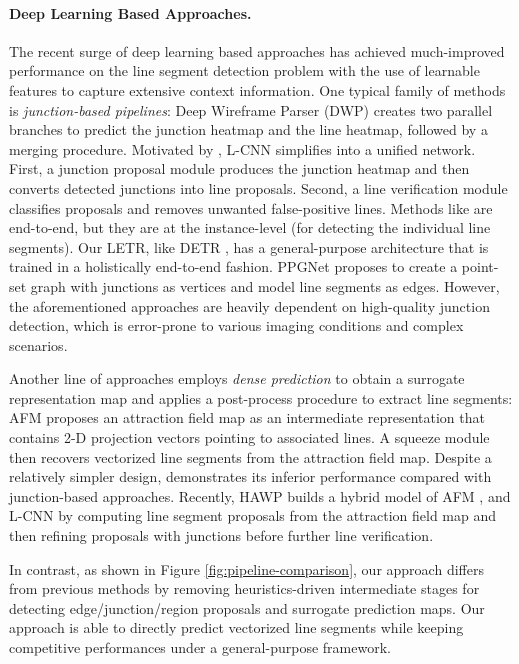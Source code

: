 \documentclass[final]{cvpr}
\begin{document}
\paragraph{Deep Learning Based Approaches.} The recent surge of deep learning based approaches has achieved much-improved performance on the line segment detection problem \cite{huang2018learning,xue2019learning,zhou2019end,PPGNet,xue2020holistically} with the use of learnable features to capture extensive context information.
One typical family of methods is \textit{junction-based pipelines}: Deep Wireframe Parser (DWP) \cite{huang2018learning} creates two parallel branches to predict the junction heatmap and the line heatmap, followed by a merging procedure. Motivated by \cite{fasterrcnn}, L-CNN \cite{zhou2019end} simplifies \cite{huang2018learning} into a unified network. First, a junction proposal module produces the junction heatmap and then converts detected junctions into line proposals. Second, a line verification module classifies proposals and removes unwanted false-positive lines. Methods like \cite{zhou2019end} are end-to-end, but they are at the instance-level (for detecting the individual line segments). Our LETR, like DETR \cite{carion2020end}, has a general-purpose architecture that is trained in a holistically end-to-end fashion. PPGNet \cite{PPGNet} proposes to create a point-set graph with junctions as vertices and model line segments as edges. However, the aforementioned approaches are heavily dependent on high-quality junction detection, which is error-prone to various imaging conditions and complex scenarios. 

Another line of approaches employs \textit{dense prediction} to obtain a surrogate representation map and applies a post-process procedure to extract line segments: AFM \cite{xue2019learning} proposes an attraction field map as an intermediate representation that contains 2-D projection vectors pointing to associated lines. A squeeze module then recovers vectorized line segments from the attraction field map. Despite a relatively simpler design, \cite{xue2019learning} demonstrates its inferior performance compared with junction-based approaches. Recently, HAWP \cite{xue2020holistically} builds a hybrid model of AFM \cite{xue2019learning}, and L-CNN \cite{zhou2019end} by computing line segment proposals from the attraction field map and then refining proposals with junctions before further line verification. 

In contrast, as shown in Figure \ref{fig:pipeline-comparison}, our approach differs from previous methods by removing heuristics-driven intermediate stages for detecting edge/junction/region proposals and surrogate prediction maps. Our approach is able to directly predict vectorized line segments while keeping competitive performances under a general-purpose framework.
\end{document}
